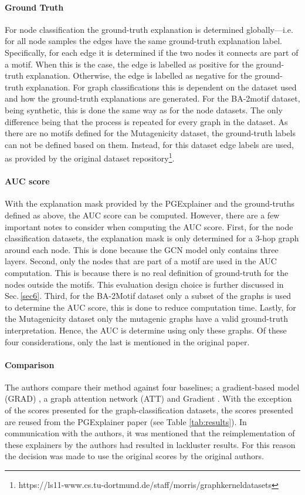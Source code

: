 \paragraph{Ground Truth }
For node classification the ground-truth explanation is determined globally---i.e. for all node samples the edges have the same ground-truth explanation label. Specifically, for each edge it is determined if the two nodes it connects are part of a motif. When this is the case, the edge is labelled as positive for the ground-truth explanation. Otherwise, the edge is labelled as negative for the ground-truth explanation. For graph classifications this is dependent on the dataset used and how the ground-truth explanations are generated. For the BA-2motif dataset, being synthetic, this is done the same way as for the node datasets. The only difference being that the process is repeated for every graph in the dataset. As there are no motifs defined for the Mutagenicity dataset, the ground-truth labels can not be defined based on them. Instead, for this dataset edge labels are used, as provided by the original dataset repository\footnote{https://ls11-www.cs.tu-dortmund.de/staff/morris/graphkerneldatasets}. 

\paragraph{AUC score}
With the explanation mask provided by the PGExplainer and the ground-truths defined as above, the AUC score can be computed. However, there are a few important notes to consider when computing the AUC score. First, for the node classification datasets, the explanation mask is only determined for a 3-hop graph around each node. This is done because the GCN model only contains three layers. Second, only the nodes that are part of a motif are used in the AUC computation. This is because there is no real definition of ground-truth for the nodes outside the motifs. This evaluation design choice is further discussed in Sec.\,\ref{sec6}. Third, for the BA-2Motif dataset only a subset of the graphs is used to determine the AUC score, this is done to reduce computation time. Lastly, for the Mutagenicity dataset only the mutagenic graphs have a valid ground-truth interpretation. Hence, the AUC is determine using only these graphs. Of these four considerations, only the last is mentioned in the original paper. 

\paragraph{Comparison} The authors compare their method against four baselines; a gradient-based model (GRAD) \cite{ying2019gnnexplainer}, a graph attention network (ATT) \cite{velivckovic2017graph} and Gradient \cite{pope2019explainability}. With the exception of the scores presented for the graph-classification datasets, the scores presented are reused from the PGExplainer paper (see Table \ref{tab:results}). In communication with the authors, it was mentioned that the reimplementation of these explainers by the authors had resulted in lackluster results. For this reason the decision was made to use the original scores by the original authors. 

